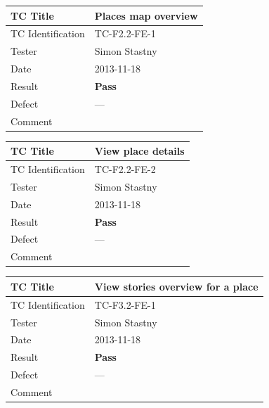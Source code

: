 \documentclass[11pt]{book}
\begin{document}

\begin{center}\begin{tabular}{| l | p{11cm} |} \hline
    TC Title          & Places map overview                       \\ \hline 
    TC Identification & TC-F2.2-FE-1                              \\ \hline 
    Tester            & Simon Stastny                             \\ \hline 
    Date              & 2013-11-18                                \\ \hline 
    Result            & \textbf{Pass}                             \\ \hline 
    Defect            & ---                                       \\ \hline 
    Comment           &                                           \\
  \hline 
\end{tabular}\end{center}

\begin{center}\begin{tabular}{| l | p{11cm} |} \hline
    TC Title          & View place details                        \\ \hline 
    TC Identification & TC-F2.2-FE-2                              \\ \hline 
    Tester            & Simon Stastny                             \\ \hline 
    Date              & 2013-11-18                                \\ \hline 
    Result            & \textbf{Pass}                             \\ \hline 
    Defect            & ---                                       \\ \hline 
    Comment           &                                           \\
  \hline 
\end{tabular}\end{center}

\begin{center}\begin{tabular}{| l | p{11cm} |} \hline
    TC Title          & View stories overview for a place         \\ \hline 
    TC Identification & TC-F3.2-FE-1                              \\ \hline 
    Tester            & Simon Stastny                             \\ \hline 
    Date              & 2013-11-18                                \\ \hline 
    Result            & \textbf{Pass}                             \\ \hline 
    Defect            & ---                                       \\ \hline 
    Comment           &                                           \\
  \hline 
\end{tabular}\end{center}
\end{document}
